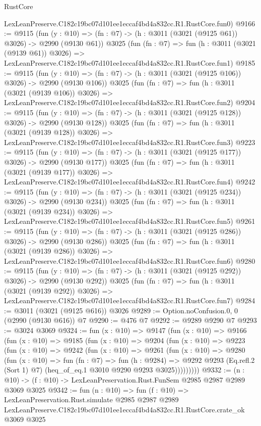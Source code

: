 \begin{lexlean}{RustCore}
\begin{coremodule}
    LexLeanPreserve.C182c19bc07d101ee1eccaf4bd4a832cc.R1.RustCore.fun0)
@9166 := @9115
    (fun (y : @10) => (fn : @7) -> (h : @3011 (@3021 (@9125 @61)) @3026) -> @2990 (@9130 @61))
    @3025
    (fun (fn : @7) =>
    fun (h : @3011 (@3021 (@9139 @61)) @3026) =>
    LexLeanPreserve.C182c19bc07d101ee1eccaf4bd4a832cc.R1.RustCore.fun1)
@9185 := @9115
    (fun (y : @10) => (fn : @7) -> (h : @3011 (@3021 (@9125 @106)) @3026) -> @2990 (@9130 @106))
    @3025
    (fun (fn : @7) =>
    fun (h : @3011 (@3021 (@9139 @106)) @3026) =>
    LexLeanPreserve.C182c19bc07d101ee1eccaf4bd4a832cc.R1.RustCore.fun2)
@9204 := @9115
    (fun (y : @10) => (fn : @7) -> (h : @3011 (@3021 (@9125 @128)) @3026) -> @2990 (@9130 @128))
    @3025
    (fun (fn : @7) =>
    fun (h : @3011 (@3021 (@9139 @128)) @3026) =>
    LexLeanPreserve.C182c19bc07d101ee1eccaf4bd4a832cc.R1.RustCore.fun3)
@9223 := @9115
    (fun (y : @10) => (fn : @7) -> (h : @3011 (@3021 (@9125 @177)) @3026) -> @2990 (@9130 @177))
    @3025
    (fun (fn : @7) =>
    fun (h : @3011 (@3021 (@9139 @177)) @3026) =>
    LexLeanPreserve.C182c19bc07d101ee1eccaf4bd4a832cc.R1.RustCore.fun4)
@9242 := @9115
    (fun (y : @10) => (fn : @7) -> (h : @3011 (@3021 (@9125 @234)) @3026) -> @2990 (@9130 @234))
    @3025
    (fun (fn : @7) =>
    fun (h : @3011 (@3021 (@9139 @234)) @3026) =>
    LexLeanPreserve.C182c19bc07d101ee1eccaf4bd4a832cc.R1.RustCore.fun5)
@9261 := @9115
    (fun (y : @10) => (fn : @7) -> (h : @3011 (@3021 (@9125 @286)) @3026) -> @2990 (@9130 @286))
    @3025
    (fun (fn : @7) =>
    fun (h : @3011 (@3021 (@9139 @286)) @3026) =>
    LexLeanPreserve.C182c19bc07d101ee1eccaf4bd4a832cc.R1.RustCore.fun6)
@9280 := @9115
    (fun (y : @10) => (fn : @7) -> (h : @3011 (@3021 (@9125 @292)) @3026) -> @2990 (@9130 @292))
    @3025
    (fun (fn : @7) =>
    fun (h : @3011 (@3021 (@9139 @292)) @3026) =>
    LexLeanPreserve.C182c19bc07d101ee1eccaf4bd4a832cc.R1.RustCore.fun7)
@9284 := @3011 (@3021 (@9125 @616)) @3026
@9289 := Option.noConfusion.{0, 0} (@2990 (@9130 @616)) @7
@9290 := @476 @7
@9292 := @9289 @9290 @7
@9293 := @3024 @3069
@9324 := fun (x : @10) =>
  @9147
    (fun (x : @10) =>
    @9166
      (fun (x : @10) =>
      @9185
        (fun (x : @10) =>
        @9204
          (fun (x : @10) =>
          @9223
            (fun (x : @10) =>
            @9242
              (fun (x : @10) =>
              @9261
                (fun (x : @10) =>
                @9280
                  (fun (x : @10) =>
                  fun (fn : @7) =>
                  fun (h : @9284) =>
                  @9292
                    @9293
                    (Eq.refl.{2} (Sort 1) @7)
                    (heq_of_eq.{1} @3010 @9290 @9293 @3025)))))))))
@9332 := (n : @10) -> (f : @10) -> LexLeanPreservation.Rust.FunSem @2985 @2987 @2989 @3069 @3025
@9342 := fun (n : @10) =>
  fun (f : @10) =>
  LexLeanPreservation.Rust.simulate
    @2985
    @2987
    @2989
    LexLeanPreserve.C182c19bc07d101ee1eccaf4bd4a832cc.R1.RustCore.crate_ok
    @3069
    @3025
\end{coremodule}
\end{lexlean}
